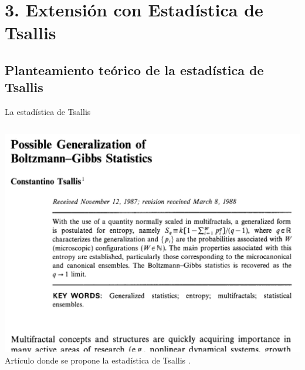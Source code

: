 \documentclass{beamer}
\begin{document}

\section[Extensión con Estadística de Tsallis]{3. Extensión con Estadística de Tsallis}
\subsection{Planteamiento teórico de la estadística de Tsallis}
\begin{frame}{La estadística de Tsallis}
  \begin{columns}
    \includegraphics[width=\linewidth]{figures/tsallis_1988.png} 
    \scriptsize \color{black} Artículo donde se propone la estadística de Tsallis \cite{Tsallis1988}.





\end{columns}
\end{frame}
\end{document}
